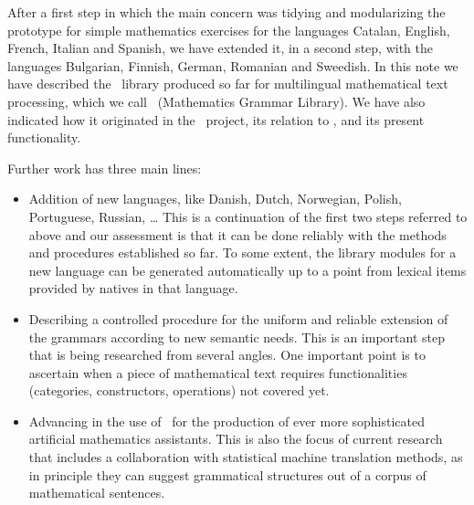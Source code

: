 \documentclass[adraft,copyright,creativecommons]{eptcs}
\begin{document}
After a first step in which the main concern was tidying and modularizing
the \webalt{} prototype for simple mathematics exercises for the languages
Catalan,
English,
French,
Italian and
Spanish,
we have extended it, in a second step, with the languages
Bulgarian, Finnish,
German, Romanian and Sweedish.
In this note we have described the \GF\ library produced so far for
multilingual mathematical text processing, which we call
\MGL\ (Mathematics Grammar Library). We have also indicated how it
originated in the \webalt\ project, its relation to \GF, and its
present functionality.

Further work has three main lines:
\begin{itemize}
\item
Addition of new languages,
like Danish, Dutch, Norwegian, Polish, Portuguese, Russian, \ldots
This is a continuation of the first two steps referred to above and
our assessment is that it can be done reliably with the methods and
procedures established so far. To some extent, the library modules for a
new language can be generated automatically up to a point
from lexical items provided by natives in that language.
\item
Describing a controlled procedure for the uniform and reliable extension
of the grammars according to new semantic needs. This is an important step
that is being researched from several angles. One important point is to
ascertain when a piece of mathematical text requires functionalities
(categories, constructors, operations) not covered yet.
\item
Advancing in the use of \MGL\ for the production of ever more
sophisticated artificial mathematics assistants. This is also the focus of
current research that includes a collaboration with statistical machine
translation methods, as in principle they can suggest grammatical structures
out of a corpus of mathematical sentences.
\end{itemize}



\nocite{*}

%

\end{document}
